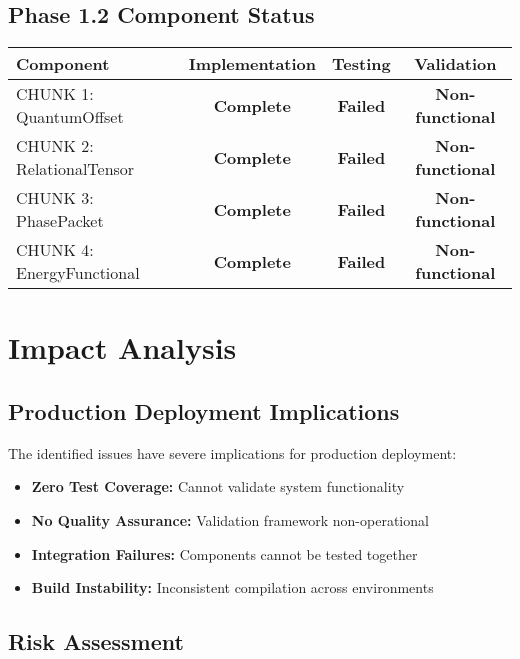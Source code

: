 \documentclass[11pt,a4paper]{article}
\newcommand{\critical}[1]{\textcolor{criticalred}{\textbf{#1}}}
\newcommand{\success}[1]{\textcolor{successgreen}{\textbf{#1}}}
\begin{document}
\subsection{Phase 1.2 Component Status}

\begin{center}
\begin{tabular}{|l|c|c|c|}
\hline
\textbf{Component} & \textbf{Implementation} & \textbf{Testing} & \textbf{Validation} \\
\hline
CHUNK 1: QuantumOffset & \success{Complete} & \critical{Failed} & \critical{Non-functional} \\
CHUNK 2: RelationalTensor & \success{Complete} & \critical{Failed} & \critical{Non-functional} \\
CHUNK 3: PhasePacket & \success{Complete} & \critical{Failed} & \critical{Non-functional} \\
CHUNK 4: EnergyFunctional & \success{Complete} & \critical{Failed} & \critical{Non-functional} \\
\hline
\end{tabular}
\end{center}

\section{Impact Analysis}

\subsection{Production Deployment Implications}

The identified issues have severe implications for production deployment:

\begin{itemize}[label=\critical{$\bullet$}]
    \item \textbf{Zero Test Coverage:} Cannot validate system functionality
    \item \textbf{No Quality Assurance:} Validation framework non-operational
    \item \textbf{Integration Failures:} Components cannot be tested together
    \item \textbf{Build Instability:} Inconsistent compilation across environments
\end{itemize}

\subsection{Risk Assessment}
\end{document}
